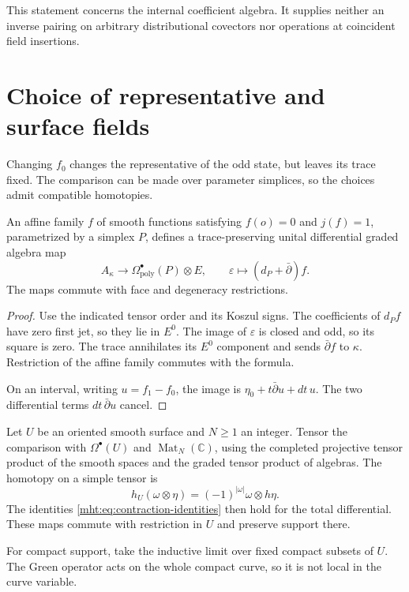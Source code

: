 This statement concerns the internal coefficient algebra. It supplies
neither an inverse pairing on arbitrary distributional covectors nor
operations at coincident field insertions.

\section{Choice of representative and surface fields}

Changing $f_0$ changes the representative of the odd state, but leaves
its trace fixed. The comparison can be made over parameter simplices,
so the choices admit compatible homotopies.

\begin{proposition}\label{mht:prop:representative-homotopies}
An affine family $f$ of smooth functions satisfying $f(o)=0$ and
$j(f)=1$, parametrized by a simplex $P$, defines a trace-preserving
unital differential graded algebra map
\[
 A_\kappa\longrightarrow\Omega^\bullet_{\mathrm{poly}}(P)\otimes E,
 \qquad \varepsilon\longmapsto(d_P+\bar\partial)f.
\]
The maps commute with face and degeneracy restrictions.
\end{proposition}

\begin{proof}
Use the indicated tensor order and its Koszul signs. The coefficients
of $d_Pf$ have zero first jet, so they lie in $E^0$. The image of
$\varepsilon$ is closed and odd, so its square is zero.
The trace annihilates its $E^0$ component and sends
$\bar\partial f$ to $\kappa$. Restriction of the affine family commutes
with the formula.

On an interval, writing $u=f_1-f_0$, the image is
$\eta_0+t\bar\partial u+dt\,u$. The two differential terms
$dt\,\bar\partial u$ cancel.
\end{proof}

Let $U$ be an oriented smooth surface and $N\geq1$ an integer.
Tensor the comparison with $\Omega^\bullet(U)$ and
$\operatorname{Mat}_N(\mathbb C)$, using the completed projective tensor
product of the smooth spaces and the graded tensor product of algebras.
The homotopy on a simple tensor is
\[
 h_U(\omega\otimes\eta)=(-1)^{|\omega|}\omega\otimes h\eta.
\]
The identities \eqref{mht:eq:contraction-identities} then hold for the
total differential. These maps commute with restriction in $U$ and
preserve support there.

For compact support, take the inductive limit
over fixed compact subsets of $U$. The Green operator acts on the whole
compact curve, so it is not local in the curve variable.

